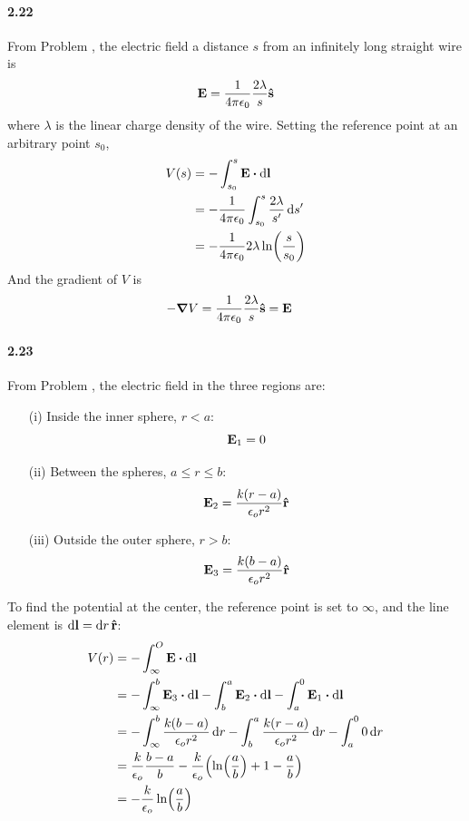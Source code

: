 \documentclass[../main.tex]{subfiles}
\begin{document}
\paragraph{2.22} \label{prob:2_22}
From Problem , the electric field a distance $s$ from an infinitely long straight
wire is
\[ \vb{E} = \frac{1}{4\pi\epsilon_0} \frac{2\lambda}{s} \vu{s} \]
where $\lambda$ is the linear charge density of the wire. Setting the reference point at an
arbitrary point $s_0$,
\begin{align*}
    V(s) &= - \int_{s_0}^s \vb{E} \vdot \dd{\vb{l}} \\
    &= - \ke \int_{s_0}^s \frac{2\lambda}{s'} \dd{s'} \\
    &= - \ke 2\lambda \ln(\frac{s}{s_0})
\end{align*}
And the gradient of $V$ is
\begin{align*}
    -\grad V &= \frac{1}{4\pi\epsilon_0} \frac{2\lambda}{s} \vu{s} = \vb{E}
\end{align*}

\paragraph{2.23}
From Problem , the electric field in the three regions are:
\begin{enumerate}
    \item[(i)] Inside the inner sphere, $r < a$:
    \[ \vb{E}_1 = 0 \]
    \item[(ii)] Between the spheres, $a \leq r \leq b$:
    \[ \vb{E}_2 = \frac{k(r - a)}{\epsilon_o r^2} \vu{r} \]
    \item[(iii)] Outside the outer sphere, $r > b$:
    \[ \vb{E}_3 = \frac{k(b - a)}{\epsilon_o r^2} \vu{r} \]
\end{enumerate}
To find the potential at the center, the reference point is set to $\infty$, and the line element is
$\dd{\vb{l}} = \dd{r} \vu{r}$:
\begin{align*}
    V(r) &= - \int_\infty^O \vb{E} \vdot \dd{\vb{l}} \\
    &= - \int_\infty^b \vb{E}_3 \vdot \dd{\vb{l}} - \int_b^a \vb{E}_2 \vdot \dd{\vb{l}}
        - \int_a^0 \vb{E}_1 \vdot \dd{\vb{l}} \\
    &= - \int_\infty^b \frac{k(b - a)}{\epsilon_o r^2} \dd{r}
        - \int_b^a \frac{k(r - a)}{\epsilon_o r^2} \dd{r} - \int_a^0 0 \dd{r} \\
    &= \frac{k}{\epsilon_o} \frac{b - a}{b}
        - \frac{k}{\epsilon_o} \qt(\ln(\frac{a}{b}) + 1 - \frac{a}{b}) \\
    &= - \frac{k}{\epsilon_o} \ln(\frac{a}{b})
\end{align*}
\end{document}
